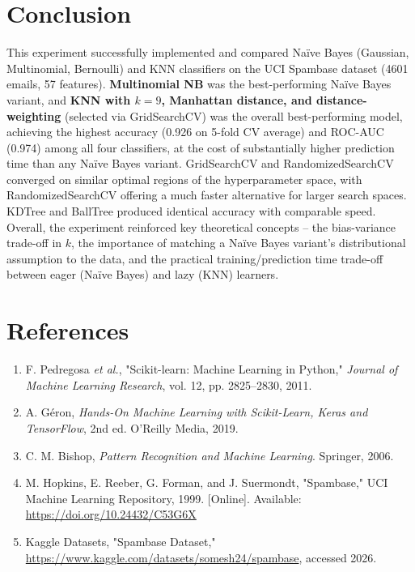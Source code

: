 \documentclass[12pt,a4paper]{article}
\begin{document}
\section{Conclusion}
This experiment successfully implemented and compared Na\"ive Bayes (Gaussian,
Multinomial, Bernoulli) and KNN classifiers on the UCI Spambase dataset (4601 emails,
57 features). \textbf{Multinomial NB} was the best-performing Na\"ive Bayes variant, and
\textbf{KNN with $k=9$, Manhattan distance, and distance-weighting} (selected via
GridSearchCV) was the overall best-performing model, achieving the highest accuracy
(0.926 on 5-fold CV average) and ROC-AUC (0.974) among all four classifiers, at the
cost of substantially higher prediction time than any Na\"ive Bayes variant.
GridSearchCV and RandomizedSearchCV converged on similar optimal regions of the
hyperparameter space, with RandomizedSearchCV offering a much faster alternative for
larger search spaces. KDTree and BallTree produced identical accuracy with comparable
speed. Overall, the experiment reinforced key theoretical concepts -- the
bias-variance trade-off in $k$, the importance of matching a Na\"ive Bayes variant's
distributional assumption to the data, and the practical training/prediction time
trade-off between eager (Na\"ive Bayes) and lazy (KNN) learners.

\section{References}
\begin{enumerate}
\item F. Pedregosa \textit{et al.}, "Scikit-learn: Machine Learning in Python," \textit{Journal of Machine Learning Research}, vol. 12, pp. 2825--2830, 2011.
\item A. G\'eron, \textit{Hands-On Machine Learning with Scikit-Learn, Keras and TensorFlow}, 2nd ed. O'Reilly Media, 2019.
\item C. M. Bishop, \textit{Pattern Recognition and Machine Learning}. Springer, 2006.
\item M. Hopkins, E. Reeber, G. Forman, and J. Suermondt, "Spambase," UCI Machine Learning Repository, 1999. [Online]. Available: \url{https://doi.org/10.24432/C53G6X}
\item Kaggle Datasets, "Spambase Dataset," \url{https://www.kaggle.com/datasets/somesh24/spambase}, accessed 2026.
\end{enumerate}
\end{document}
